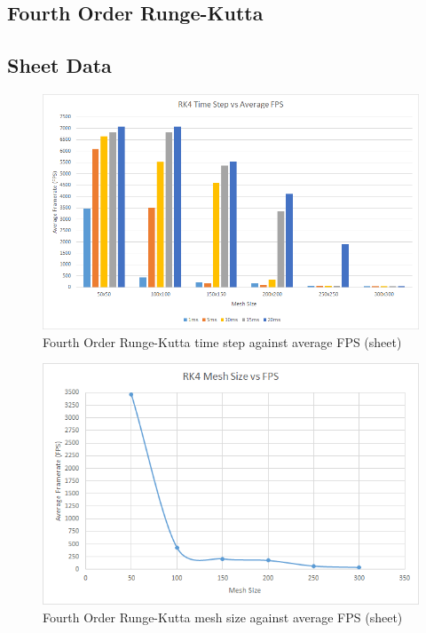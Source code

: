 \begin{landscape}

\section{Fourth Order Runge-Kutta}

\subsection{Sheet Data}

  \begin{figure}[!htb]
    \begin{center}
      \includegraphics{Figures/sheet_rk4_fps}
    \end{center}
    \caption{Fourth Order Runge-Kutta time step against average FPS (sheet)}
    \label{fig:rk4 fps sheet}
  \end{figure}
\end{landscape}
  
    \begin{figure}
    \begin{center}
      \includegraphics[scale=.9]{Figures/sheet_rk4_m_fps}
    \end{center}
    \caption{Fourth Order Runge-Kutta mesh size against average FPS (sheet)}
    \label{fig:rk4 mesh fps sheet}
  \end{figure}
  
